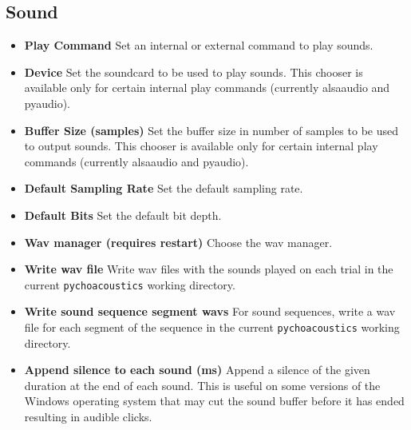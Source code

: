 \subsection{Sound}
\label{sec:pref_dialog_sound}
\begin{itemize}
\item \textbf{Play Command} Set an internal or external command to play sounds.
\item \textbf{Device} Set the soundcard to be used to play sounds. This chooser is available
  only for certain internal play commands (currently alsaaudio and pyaudio).
\item \textbf{Buffer Size (samples)} Set the buffer size in number of samples to be used to output sounds. This chooser is available only for certain internal play commands (currently alsaaudio and pyaudio).
\item \textbf{Default Sampling Rate} Set the default sampling rate.
\item \textbf{Default Bits} Set the default bit depth.
\item \textbf{Wav manager (requires restart)} Choose the wav manager.
\item \textbf{Write wav file} Write wav files with the sounds played on each trial in the current \texttt{pychoacoustics} working directory.
\item \textbf{Write sound sequence segment wavs} For sound sequences, write a wav file for each segment of the sequence in the current \texttt{pychoacoustics} working directory.
\item \textbf{Append silence to each sound (ms)} Append a silence of the given duration at the end of each sound. This is useful on some versions of the Windows operating system that may cut the sound buffer before it has ended resulting in audible clicks.
\end{itemize}

